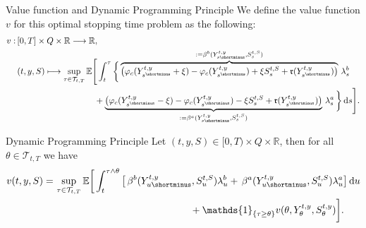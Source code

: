 \documentclass[10pt]{beamer}
\newcommand{\Tc}{{\mathcal T}}
\newcommand{\fee}{\mathfrak{r}}
\begin{document}
\begin{frame}{Value function and Dynamic Programming Principle}
We define the value function $v$ for this optimal stopping time problem as the following:
\begin{equation}
\scalebox{0.9}{$
\begin{aligned}
v:\, & [0,T] \times Q \times \mathbb{R} \longrightarrow \mathbb{R}, \\
& (t, y, S) \longmapsto \sup_{\tau \in \mathcal{T}_{t,T}} \mathbb{E} \Bigg[ \int_{t}^{\tau} \bigg\{\overbrace{\left(\varphi_c(Y^{t,y}_{s^\shortminus} + \xi) - \varphi_c(Y^{t,y}_{s^\shortminus}) + \xi S^{t,S}_s + \fee(Y^{t,y}_{s^\shortminus})\right)}^{:=\beta^b(Y^{t,y}_{s\shortminus},S^{t,S}_s)}\,\lambda^b_s\, \\
& \quad \quad \quad \quad \quad \quad \quad \quad \quad + \underbrace{\left( \varphi_c(Y^{t,y}_{s^\shortminus} - \xi) - \varphi_c(Y^{t,y}_{s^\shortminus}) - \xi S^{t,S}_s + \fee(Y^{t,y}_{s^\shortminus}) \right)}_{:=\beta^a(Y^{t,y}_{s\shortminus},S^{t,S}_s)}\,\lambda^a_s\,
\bigg\} \,\mathrm{d}s \Bigg]. \nonumber
\end{aligned}$}
\end{equation}\pause
\vspace{-0.5em}
\begin{block}{Dynamic Programming Principle}\pause
Let $(t,y,S) \in [0,T) \times Q \times \mathbb{R}$, then for all $\theta \in \mathcal{T}_{t,T}$ we have
\vspace{-0.5em}
    \begin{equation}
    \begin{aligned}
        v(t, y, S) = & \, \sup_{\tau \in \Tc_{t,T}} \mathbb{E}\bigg[\int_{t}^{\tau \wedge \theta}  \left[\, \beta^b(Y^{t,y}_{u\shortminus},S^{t,S}_u) \lambda^b_u +  \, \beta^a(Y^{t,y}_{u\shortminus}, S^{t,S}_u)\lambda^a_u \right] \text{d} u \bigg. \nonumber \\
        & \qquad \qquad \qquad \qquad \qquad \qquad \qquad + \mathds{1}_{\{\tau \geq \theta\}}v(\theta, Y^{t, y}_{\theta}, S^{t, y}_{\theta}) \bigg. \bigg] \nonumber.
    \end{aligned}
    \end{equation}
\end{block}

\end{frame}
\end{document}
